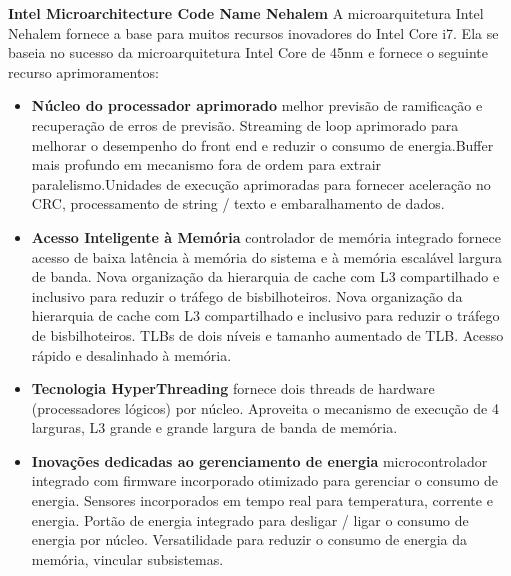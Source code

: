 \documentclass[12pt,a4paper,brazilian,utf8]{ppgsi}
\begin{document}
    \textbf{Intel Microarchitecture Code Name Nehalem}
    A microarquitetura Intel Nehalem fornece a base para muitos recursos inovadores do Intel Core i7. Ela se baseia no sucesso da microarquitetura Intel Core de 45nm e fornece o seguinte recurso aprimoramentos:
    \begin{itemize}
        \item \textbf{Núcleo do processador aprimorado}
        melhor previsão de ramificação e recuperação de erros de previsão. Streaming de loop aprimorado para melhorar o desempenho do front end e reduzir o consumo de energia.Buffer mais profundo em mecanismo fora de ordem para extrair paralelismo.Unidades de execução aprimoradas para fornecer aceleração no CRC, processamento de string / texto e embaralhamento de dados.
        \item \textbf{Acesso Inteligente à Memória}
        controlador de memória integrado fornece acesso de baixa latência à memória do sistema e à memória escalável
        largura de banda. Nova organização da hierarquia de cache com L3 compartilhado e inclusivo para reduzir o tráfego de bisbilhoteiros. Nova organização da hierarquia de cache com L3 compartilhado e inclusivo para reduzir o tráfego de bisbilhoteiros. TLBs de dois níveis e tamanho aumentado de TLB. Acesso rápido e desalinhado à memória.
        \item \textbf{Tecnologia HyperThreading}
        fornece dois threads de hardware (processadores lógicos) por núcleo. Aproveita o mecanismo de execução de 4 larguras, L3 grande e grande largura de banda de memória. 
        \item \textbf{Inovações dedicadas ao gerenciamento de energia}
        microcontrolador integrado com firmware incorporado otimizado para gerenciar o consumo de energia. Sensores incorporados em tempo real para temperatura, corrente e energia. Portão de energia integrado para desligar / ligar o consumo de energia por núcleo. Versatilidade para reduzir o consumo de energia da memória, vincular subsistemas.
    \end{itemize}
\end{document}

